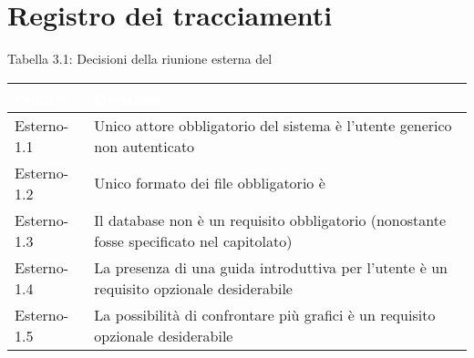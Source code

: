 \section{Registro dei tracciamenti}
{
Tabella 3.1: Decisioni della riunione esterna del \Data{}
\renewcommand{\arraystretch}{1.5}
\centering
\begin{longtable}{C{3cm} C{9cm}}
\textcolor{white}{\textbf{Codice}}&
\textcolor{white}{\textbf{Decisione}}\\	
\endhead
		
Esterno-1.1 & Unico attore obbligatorio del sistema è l'utente generico non autenticato\\

Esterno-1.2 & Unico formato dei file obbligatorio è \\

Esterno-1.3 & Il database non è un requisito obbligatorio (nonostante fosse specificato nel capitolato)\\

Esterno-1.4 & La presenza di una guida introduttiva per l'utente è un requisito opzionale desiderabile\\

Esterno-1.5 & La possibilità di confrontare più grafici è un requisito opzionale desiderabile\\
		
\end{longtable}
}
